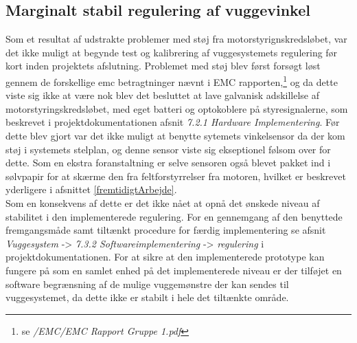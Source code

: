 \subsection{Marginalt stabil regulering af vuggevinkel}
Som et resultat af udstrakte problemer med støj fra motorstyrignskredsløbet, var det ikke muligt at begynde test og kalibrering af vuggesystemets regulering før kort inden projektets afslutning. Problemet med støj blev først forsøgt løst gennem de forskellige emc betragtninger nævnt i EMC rapporten,\footnote{se \citep{cd} \textit{/EMC/EMC Rapport Gruppe 1.pdf}} og da dette viste sig ikke at være nok blev det besluttet at lave galvanisk adskillelse af motorstyringskredsløbet, med eget batteri og optokoblere på styresignalerne, som beskrevet i projektdokumentationen afsnit \textit{7.2.1 Hardware Implementering}. Før dette blev gjort var det ikke muligt at benytte sytemets vinkelsensor da der kom støj i systemets stelplan, og denne sensor viste sig ekseptionel følsom over for dette. Som en ekstra foranstaltning er selve sensoren også blevet pakket ind i sølvpapir for at skærme den fra feltforstyrrelser fra motoren, hvilket er beskrevet yderligere i afsnittet \vref{fremtidigtArbejde}.\\
Som en konsekvens af dette er det ikke nået at opnå det ønskede niveau af stabilitet i den implementerede regulering. For en gennemgang af den benyttede fremgangsmåde samt tiltænkt procedure for færdig implementering se afsnit \textit{Vuggesystem} -> \textit{7.3.2 Softwareimplementering} -> \textit{regulering} i projektdokumentationen. For at sikre at den implementerede prototype kan fungere på som en samlet enhed på det implementerede niveau er der tilføjet en software begrænsning af de mulige vuggemønstre der kan sendes til vuggesystemet, da dette ikke er stabilt i hele det tiltænkte område.